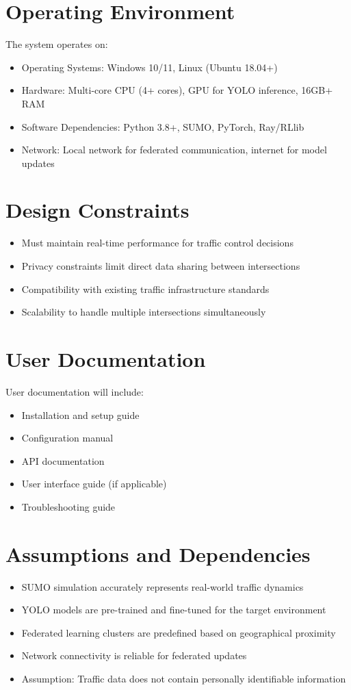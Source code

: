 \section{Operating Environment}

The system operates on:
\begin{itemize}
\item Operating Systems: Windows 10/11, Linux (Ubuntu 18.04+)
\item Hardware: Multi-core CPU (4+ cores), GPU for YOLO inference, 16GB+ RAM
\item Software Dependencies: Python 3.8+, SUMO, PyTorch, Ray/RLlib
\item Network: Local network for federated communication, internet for model updates
\end{itemize}

\section{Design Constraints}

\begin{itemize}
\item Must maintain real-time performance for traffic control decisions
\item Privacy constraints limit direct data sharing between intersections
\item Compatibility with existing traffic infrastructure standards
\item Scalability to handle multiple intersections simultaneously
\end{itemize}

\section{User Documentation}

User documentation will include:
\begin{itemize}
\item Installation and setup guide
\item Configuration manual
\item API documentation
\item User interface guide (if applicable)
\item Troubleshooting guide
\end{itemize}

\section{Assumptions and Dependencies}

\begin{itemize}
\item SUMO simulation accurately represents real-world traffic dynamics
\item YOLO models are pre-trained and fine-tuned for the target environment
\item Federated learning clusters are predefined based on geographical proximity
\item Network connectivity is reliable for federated updates
\item Assumption: Traffic data does not contain personally identifiable information
\end{itemize}